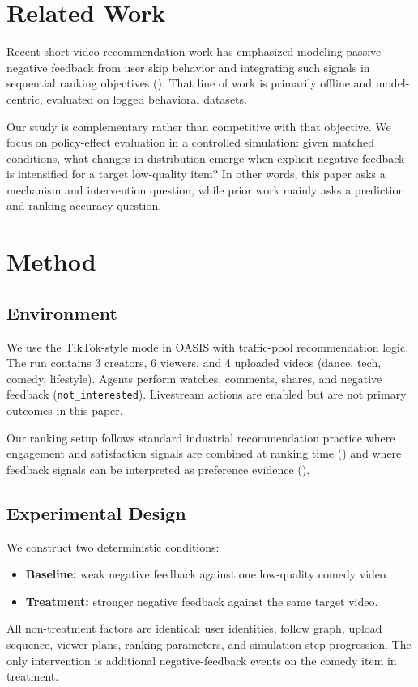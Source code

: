 \documentclass[11pt]{article}
\begin{document}
\section{Related Work}
Recent short-video recommendation work has emphasized modeling passive-negative
feedback from user skip behavior and integrating such signals in sequential
ranking objectives (\cite{pan2023passivenegative}). That line of work is
primarily offline and model-centric, evaluated on logged behavioral datasets.

Our study is complementary rather than competitive with that objective. We focus
on policy-effect evaluation in a controlled simulation: given matched
conditions, what changes in distribution emerge when explicit negative feedback
is intensified for a target low-quality item? In other words, this paper asks a
mechanism and intervention question, while prior work mainly asks a prediction
and ranking-accuracy question.

\section{Method}
\subsection{Environment}
We use the TikTok-style mode in OASIS with traffic-pool recommendation logic.
The run contains 3 creators, 6 viewers, and 4 uploaded videos (dance, tech,
comedy, lifestyle). Agents perform watches, comments, shares, and negative
feedback (\texttt{not\_interested}). Livestream actions are enabled but are not
primary outcomes in this paper.

Our ranking setup follows standard industrial recommendation practice where
engagement and satisfaction signals are combined at ranking time
(\cite{covington2016youtube,zhao2019multitask}) and where feedback signals can
be interpreted as preference evidence (\cite{rendle2009bpr}).

\subsection{Experimental Design}
We construct two deterministic conditions:
\begin{itemize}
\item \textbf{Baseline:} weak negative feedback against one low-quality comedy video.
\item \textbf{Treatment:} stronger negative feedback against the same target video.
\end{itemize}
All non-treatment factors are identical: user identities, follow graph, upload
sequence, viewer plans, ranking parameters, and simulation step progression. The
only intervention is additional negative-feedback events on the comedy item in
treatment.
\end{document}
